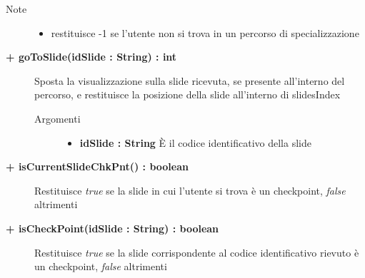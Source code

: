 \begin{description}
\begin{description}
		\begin{description}
			
			\item[Note] \hfill	
				\begin{itemize}
					\item restituisce -1 se l'utente non si trova in un percorso di specializzazione
				\end{itemize}
		\end{description}
			
	\end{description}
	
	\begin{description}
		\item[\textbf{\color{blue}+ goToSlide(idSlide : String) : int			}] \hfill
			Sposta la visualizzazione sulla slide ricevuta, se presente all'interno del percorso, e restituisce la posizione della slide all'interno di slidesIndex
			
		\begin{description}
			\item[Argomenti] \hfill
				\begin{itemize}
				
					\item \textbf{idSlide : String	} \hfill
					È il codice identificativo della slide
					
				\end{itemize}
			
		\end{description}
	\end{description}
	
	\begin{description}
		\item[\textbf{\color{blue}+ isCurrentSlideChkPnt() : boolean			}] \hfill
			Restituisce \textit{true} se la slide in cui l'utente si trova è un checkpoint, \textit{false} altrimenti
			
	\end{description}
	
	\begin{description}
		\item[\textbf{\color{blue}+ isCheckPoint(idSlide : String) : boolean			}] \hfill
			Restituisce \textit{true} se la slide corrispondente al codice identificativo rievuto è un checkpoint, \textit{false} altrimenti
			

\end{description}
\end{description}
